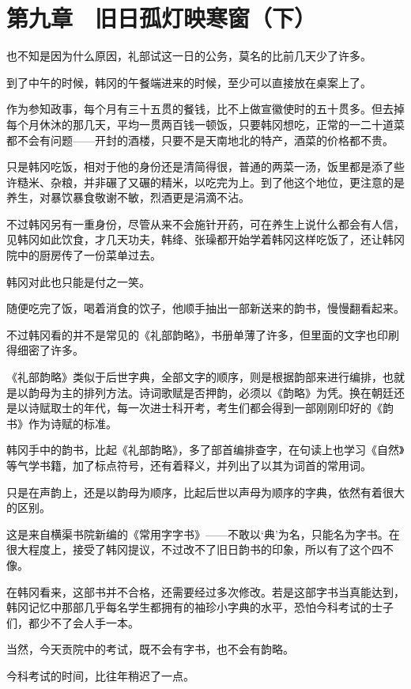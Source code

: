\section{第九章　旧日孤灯映寒窗（下）}

也不知是因为什么原因，礼部试这一日的公务，莫名的比前几天少了许多。

到了中午的时候，韩冈的午餐端进来的时候，至少可以直接放在桌案上了。

作为参知政事，每个月有三十五贯的餐钱，比不上做宣徽使时的五十贯多。但去掉每个月休沐的那几天，平均一贯两百钱一顿饭，只要韩冈想吃，正常的一二十道菜都不会有问题——开封的酒楼，只要不是天南地北的特产，酒菜的价格都不贵。

只是韩冈吃饭，相对于他的身份还是清简得很，普通的两菜一汤，饭里都是添了些许糙米、杂粮，并非碾了又碾的精米，以吃完为上。到了他这个地位，更注意的是养生，对暴饮暴食敬谢不敏，烈酒更是涓滴不沾。

不过韩冈另有一重身份，尽管从来不会施针开药，可在养生上说什么都会有人信，见韩冈如此饮食，才几天功夫，韩绛、张璪都开始学着韩冈这样吃饭了，还让韩冈院中的厨房传了一份菜单过去。

韩冈对此也只能是付之一笑。

随便吃完了饭，喝着消食的饮子，他顺手抽出一部新送来的韵书，慢慢翻看起来。

不过韩冈看的并不是常见的《礼部韵略》，书册单薄了许多，但里面的文字也印刷得细密了许多。

《礼部韵略》类似于后世字典，全部文字的顺序，则是根据韵部来进行编排，也就是以韵母为主的排列方法。诗词歌赋是否押韵，必须以《韵略》为凭。换在朝廷还是以诗赋取士的年代，每一次进士科开考，考生们都会得到一部刚刚印好的《韵书》作为诗赋的标准。

韩冈手中的韵书，比起《礼部韵略》，多了部首编排查字，在句读上也学习《自然》等气学书籍，加了标点符号，还有着释义，并列出了以其为词首的常用词。

只是在声韵上，还是以韵母为顺序，比起后世以声母为顺序的字典，依然有着很大的区别。

这是来自横渠书院新编的《常用字字书》——不敢以‘典’为名，只能名为字书。在很大程度上，接受了韩冈提议，不过改不了旧日韵书的印象，所以有了这个四不像。

在韩冈看来，这部书并不合格，还需要经过多次修改。若是这部字书当真能达到，韩冈记忆中那部几乎每名学生都拥有的袖珍小字典的水平，恐怕今科考试的士子们，都少不了会人手一本。

当然，今天贡院中的考试，既不会有字书，也不会有韵略。

今科考试的时间，比往年稍迟了一点。

